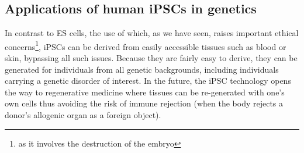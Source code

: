 




\subsection{Applications of human iPSCs in genetics}
\label{sec:ips_genetics}

In contrast to ES cells, the use of which, as we have seen, raises important ethical concerns\footnote{as it involves the destruction of the embryo}, iPSCs
can be derived from easily accessible tissues such as blood or skin, bypassing all such issues.
Because they are fairly easy to derive, they can be generated for individuals from all genetic backgrounds, including individuals carrying a genetic disorder of interest.
In the future, the iPSC technology opens the way to regenerative medicine where tissues can be re-generated with one's own cells thus avoiding the risk of immune rejection (when the body rejects a donor's allogenic organ as a foreign object).\\

